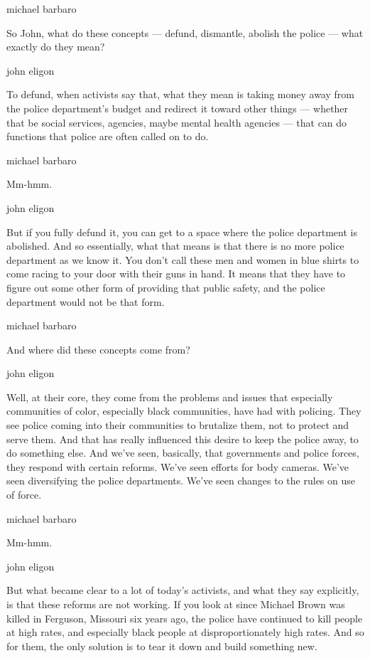 michael barbaro

So John, what do these concepts --- defund, dismantle, abolish the
police --- what exactly do they mean?

john eligon

To defund, when activists say that, what they mean is taking money away
from the police department's budget and redirect it toward other things
--- whether that be social services, agencies, maybe mental health
agencies --- that can do functions that police are often called on to
do.

michael barbaro

Mm-hmm.

john eligon

But if you fully defund it, you can get to a space where the police
department is abolished. And so essentially, what that means is that
there is no more police department as we know it. You don't call these
men and women in blue shirts to come racing to your door with their guns
in hand. It means that they have to figure out some other form of
providing that public safety, and the police department would not be
that form.

michael barbaro

And where did these concepts come from?

john eligon

Well, at their core, they come from the problems and issues that
especially communities of color, especially black communities, have had
with policing. They see police coming into their communities to
brutalize them, not to protect and serve them. And that has really
influenced this desire to keep the police away, to do something else.
And we've seen, basically, that governments and police forces, they
respond with certain reforms. We've seen efforts for body cameras. We've
seen diversifying the police departments. We've seen changes to the
rules on use of force.

michael barbaro

Mm-hmm.

john eligon

But what became clear to a lot of today's activists, and what they say
explicitly, is that these reforms are not working. If you look at since
Michael Brown was killed in Ferguson, Missouri six years ago, the police
have continued to kill people at high rates, and especially black people
at disproportionately high rates. And so for them, the only solution is
to tear it down and build something new.

